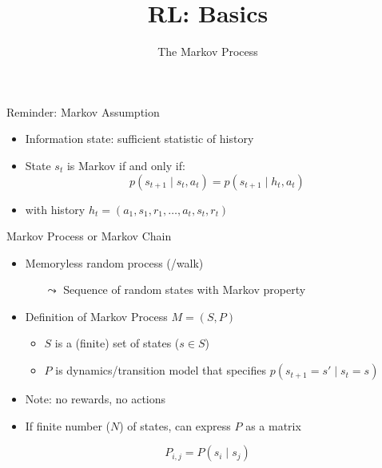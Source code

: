 \documentclass[aspectratio=169]{../latex_main/tntbeamer}  %
\title[Reinforcement Learning: Basics]{RL: Basics}
\subtitle{The Markov Process}
\begin{document}
	
	\maketitle

\begin{frame}[c]{Reminder: Markov Assumption}

\begin{itemize}
	\item Information state: sufficient statistic of history
	\item State $s_t$ is Markov if and only if:
	$$ p(s_{t+1} \mid s_t, a_t) = p(s_{t+1} \mid h_t, a_t)$$
	\item with history $h_t = (a_1, s_1, r_1, \ldots, a_t, s_t, r_t)$
\end{itemize}

\end{frame}
\begin{frame}[c]{Markov Process or Markov Chain}
	
	\begin{itemize}
		\item Memoryless random process (/walk)
		\begin{itemize}
			\item[$\leadsto$] Sequence of random states with Markov property
		\end{itemize}
		\item Definition of Markov Process $M = (S, P)$
		\begin{itemize}
			\item $S$ is a (finite) set of states ($s \in S$)
			\item $P$ is dynamics/transition model that specifies $p(s_{t+1} = s' \mid s_t = s)$
		\end{itemize}
		\item Note: no rewards, no actions
		\item If finite number ($N$) of states, can express $P$ as a matrix
	\end{itemize}

$$P_{i,j} = P(s_i \mid s_j) $$
	
\end{frame}
\end{document}
